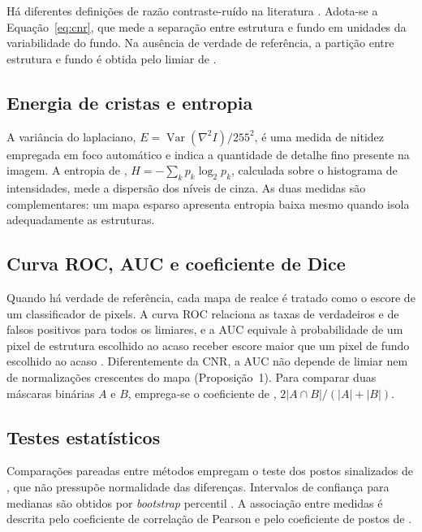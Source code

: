 \documentclass[12pt, oneside, a4paper, chapter=TITLE, section=TITLE,
               english, brazil]{abntex2}
\begin{document}
Há diferentes definições de razão contraste-ruído na literatura
\citep*{Welvaert2013}. Adota-se a Equação~\eqref{eq:cnr}, que mede a separação
entre estrutura e fundo em unidades da variabilidade do fundo. Na ausência de
verdade de referência, a partição entre estrutura e fundo é obtida pelo
limiar de \citet{Otsu1979}.

\subsection{Energia de cristas e entropia}

A variância do laplaciano, $E = \operatorname{Var}(\nabla^2 I)/255^2$, é uma
medida de nitidez empregada em foco automático \citep*{PechPacheco2000} e
indica a quantidade de detalhe fino presente na imagem. A entropia de
\citet{Shannon1948}, $H = -\sum_k p_k \log_2 p_k$, calculada sobre o
histograma de intensidades, mede a dispersão dos níveis de cinza. As duas
medidas são complementares: um mapa esparso apresenta entropia baixa mesmo
quando isola adequadamente as estruturas.

\subsection{Curva ROC, AUC e coeficiente de Dice}

Quando há verdade de referência, cada mapa de realce é tratado como o escore
de um classificador de pixels. A curva ROC relaciona as taxas de verdadeiros e
de falsos positivos para todos os limiares, e a AUC equivale à probabilidade
de um pixel de estrutura escolhido ao acaso receber escore maior que um pixel
de fundo escolhido ao acaso \citep*{Fawcett2006,HanleyMcNeil1982}.
Diferentemente da CNR, a AUC não depende de limiar nem de normalizações
crescentes do mapa (Proposição~1). Para comparar duas máscaras binárias $A$ e
$B$, emprega-se o coeficiente de \citet{Dice1945},
$2|A \cap B|/(|A| + |B|)$.

\subsection{Testes estatísticos}

Comparações pareadas entre métodos empregam o teste dos postos sinalizados de
\citet{Wilcoxon1945}, que não pressupõe normalidade das diferenças. Intervalos
de confiança para medianas são obtidos por \emph{bootstrap} percentil
\citep*{Efron1979}. A associação entre medidas é descrita pelo coeficiente de
correlação de Pearson e pelo coeficiente de postos de \citet{Spearman1904}.
\end{document}
